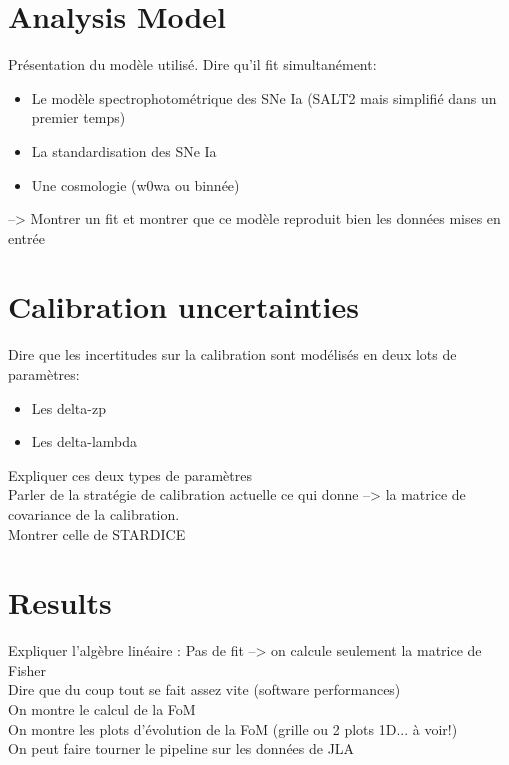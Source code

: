 \documentclass[\docopts]{\docclass}
\begin{document}

\section{Analysis Model}
\label{sec::analysis_model}
Présentation du modèle utilisé.
Dire qu'il fit simultanément:
\begin{itemize}
\item Le modèle spectrophotométrique des SNe Ia (SALT2 mais simplifié dans un premier temps)
\item La standardisation des SNe Ia
\item Une cosmologie (w0wa ou binnée) \\
\end{itemize}
--> Montrer un fit et montrer que ce modèle reproduit bien les données mises en entrée


\section{Calibration uncertainties}
\label{sec::calib_uncertainties}
Dire que les incertitudes sur la calibration sont modélisés en deux lots de paramètres:
\begin{itemize}
\item Les delta-zp
\item Les delta-lambda
\end{itemize}
Expliquer ces deux types de paramètres\\
Parler de la stratégie de calibration actuelle ce qui donne --> la matrice de covariance de la calibration.\\
Montrer celle de STARDICE


\section{Results}
\label{sec::results}
Expliquer l'algèbre linéaire : Pas de fit --> on calcule seulement la matrice de Fisher \\
Dire que du coup tout se fait assez vite (software performances) \\
On montre le calcul de la FoM \\
On montre les plots d'évolution de la FoM (grille ou 2 plots 1D... à voir!) \\
On peut faire tourner le pipeline sur les données de JLA \\
\end{document}
